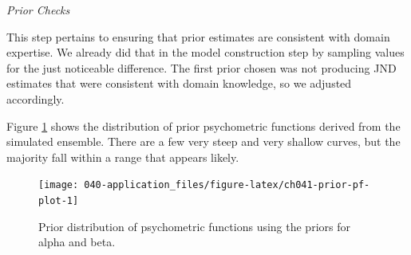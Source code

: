 \documentclass[11pt, oneside, openany]{scrbook}
\newenvironment{Shaded}{\begin{snugshade}}{\end{snugshade}}
\newcommand{\AttributeTok}[1]{\textcolor[rgb]{0.13,0.29,0.53}{#1}}
\newcommand{\ConstantTok}[1]{\textcolor[rgb]{0.56,0.35,0.01}{#1}}
\newcommand{\DecValTok}[1]{\textcolor[rgb]{0.00,0.00,0.81}{#1}}
\newcommand{\FloatTok}[1]{\textcolor[rgb]{0.00,0.00,0.81}{#1}}
\newcommand{\FunctionTok}[1]{\textcolor[rgb]{0.13,0.29,0.53}{\textbf{#1}}}
\newcommand{\NormalTok}[1]{#1}
\newcommand{\OtherTok}[1]{\textcolor[rgb]{0.56,0.35,0.01}{#1}}
\newcommand{\SpecialCharTok}[1]{\textcolor[rgb]{0.81,0.36,0.00}{\textbf{#1}}}
\begin{document}
\begin{Shaded}
\end{Shaded}


\emph{Prior Checks}

This step pertains to ensuring that prior estimates are consistent with domain expertise. We already did that in the model construction step by sampling values for the just noticeable difference. The first prior chosen was not producing JND estimates that were consistent with domain knowledge, so we adjusted accordingly.

Figure \ref{fig:ch041-prior-pf-plot} shows the distribution of prior psychometric functions derived from the simulated ensemble. There are a few very steep and very shallow curves, but the majority fall within a range that appears likely.

\begin{figure}

{\centering \texttt{[image: 040-application\_files/figure-latex/ch041-prior-pf-plot-1]} 

}

\caption{Prior distribution of psychometric functions using the priors for alpha and beta.}\label{fig:ch041-prior-pf-plot}
\end{figure}
\end{document}
